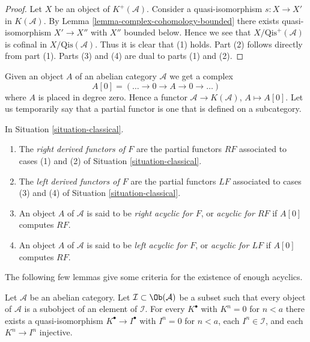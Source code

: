 \begin{proof}
Let $X$ be an object of $K^{+}(\mathcal{A})$.
Consider a quasi-isomorphism $s : X \to X'$ in $K(\mathcal{A})$.
By
Lemma \ref{lemma-complex-cohomology-bounded}
there exists quasi-isomorphism $X' \to X''$ with $X''$ bounded below.
Hence we see that $X/\text{Qis}^+(\mathcal{A})$ is cofinal
in $X/\text{Qis}(\mathcal{A})$. Thus it is clear that (1) holds.
Part (2) follows directly from part (1).
Parts (3) and (4) are dual to parts (1) and (2).
\end{proof}

\noindent
Given an object $A$ of an abelian category $\mathcal{A}$ we get a complex
$$
A[0] = ( \ldots \to 0 \to A \to 0 \to \ldots )
$$
where $A$ is placed in degree zero. Hence a functor
$\mathcal{A} \to K(\mathcal{A})$, $A \mapsto A[0]$.
Let us temporarily say that a partial functor is one that is
defined on a subcategory.

\begin{definition}
\label{definition-derived-functor}
In
Situation \ref{situation-classical}.
\begin{enumerate}
\item The {\it right derived functors of $F$} are the partial functors
$RF$ associated to cases (1) and (2) of
Situation \ref{situation-classical}.
\item The {\it left derived functors of $F$} are the partial functors
$LF$ associated to cases (3) and (4) of
Situation \ref{situation-classical}.
\item An object $A$ of $\mathcal{A}$ is said to be
{\it right acyclic for $F$}, or {\it acyclic for $RF$}
if $A[0]$ computes $RF$.
\item An object $A$ of $\mathcal{A}$ is said to be
{\it left acyclic for $F$}, or {\it acyclic for $LF$}
if $A[0]$ computes $RF$.
\end{enumerate}
\end{definition}

\noindent
The following few lemmas give some criteria for the existence of
enough acyclics.

\begin{lemma}
\label{lemma-subcategory-right-resolution}
Let $\mathcal{A}$ be an abelian category.
Let $\mathcal{I} \subset \Ob(\mathcal{A})$ be a subset such
that every object of $\mathcal{A}$ is a subobject of an element of
$\mathcal{I}$. For every $K^\bullet$ with $K^n = 0$ for $n < a$
there exists a quasi-isomorphism $K^\bullet \to I^\bullet$
with $I^n = 0$ for $n < a$, each $I^n \in \mathcal{I}$, and
each $K^n \to I^n$ injective.
\end{lemma}

